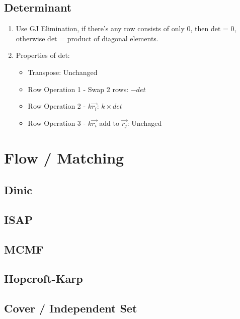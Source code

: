 \documentclass[a4paper,10pt,twocolumn,oneside]{article}
\begin{document}
\subsection{Determinant}
{\normalsize
\noindent
\begin{enumerate}
\item Use GJ Elimination, if there's any row consists of only 0, then det = 0, otherwise det = product of diagonal elements.
\item Properties of det:
\begin{itemize}
    \item Transpose: Unchanged
    \item Row Operation 1 - Swap 2 rows: $-det$
    \item Row Operation 2 - $k \overrightarrow{r_i}$: $k \times det$
    \item Row Operation 3 - $k \overrightarrow{r_i}$ add to  $\overrightarrow{r_j}$: Unchaged
\end{itemize}
\end{enumerate}
}

\section{Flow / Matching}

\subsection{Dinic}


\subsection{ISAP}


\subsection{MCMF}


\subsection{Hopcroft-Karp}


\subsection{Cover / Independent Set}

\end{document}
